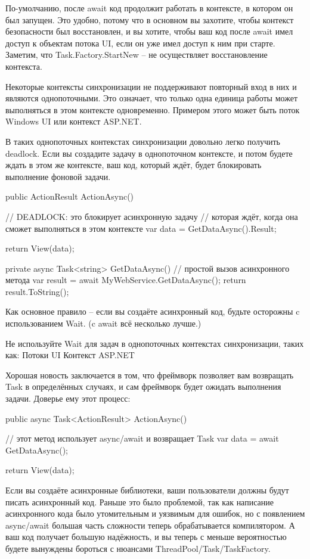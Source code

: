 По-умолчанию, после await код продолжит работать в контексте, в котором он был запущен. Это удобно, потому что в основном вы захотите, чтобы контекст безопасности был восстановлен, и вы хотите, чтобы ваш код после await имел доступ к объектам потока UI, если он уже имел доступ к ним при старте. Заметим, что Task.Factory.StartNew – не осуществляет восстановление контекста.

Некоторые контексты синхронизации не поддерживают повторный вход в них и являются однопоточными. Это означает, что только одна единица работы может выполняться в этом контексте одновременно. Примером этого может быть поток Windows UI или контекст ASP.NET.

В таких однопоточных контекстах синхронизации довольно легко получить deadlock. Если вы создадите задачу в однопоточном контексте, и потом будете ждать в этом же контексте, ваш код, который ждёт, будет блокировать выполнение фоновой задачи.

public ActionResult ActionAsync()
{
    // DEADLOCK: это блокирует асинхронную задачу
    // которая ждёт, когда она сможет выполняться в этом контексте
    var data = GetDataAsync().Result;

    return View(data);
}

private async Task<string> GetDataAsync()
{
    // простой вызов асинхронного метода
    var result = await MyWebService.GetDataAsync();
    return result.ToString();
}

Как основное правило – если вы создаёте асинхронный код, будьте осторожны c использованием Wait. (c await всё несколько лучше.)

Не используйте Wait для задач в однопоточных контекстах синхронизации, таких как:
Потоки UI
Контекст ASP.NET

Хорошая новость заключается в том, что фреймворк позволяет вам возвращать Task в определённых случаях, и сам фреймворк будет ожидать выполнения задачи. Доверье ему этот процесс:

public async Task<ActionResult> ActionAsync()
{
    // этот метод использует async/await и возвращает Task
    var data = await GetDataAsync();

    return View(data);
}

Если вы создаёте асинхронные библиотеки, ваши пользователи должны будут писать асинхронный код. Раньше это было проблемой, так как написание асинхронного кода было утомительным и уязвимым для ошибок, но с появлением async/await большая часть сложности теперь обрабатывается компилятором. А ваш код получает большую надёжность, и вы теперь с меньше вероятностью будете вынуждены бороться с нюансами ThreadPool/Task/TaskFactory.


